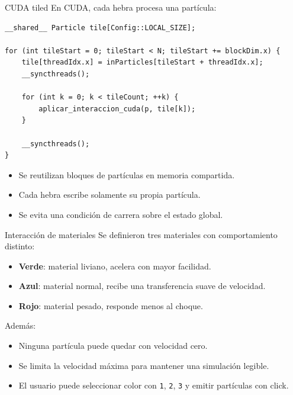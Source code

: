 \documentclass[aspectratio=169]{beamer}
\begin{document}
\begin{frame}[fragile]{CUDA tiled}
    En CUDA, cada hebra procesa una partícula:

\begin{verbatim}
__shared__ Particle tile[Config::LOCAL_SIZE];

for (int tileStart = 0; tileStart < N; tileStart += blockDim.x) {
    tile[threadIdx.x] = inParticles[tileStart + threadIdx.x];
    __syncthreads();

    for (int k = 0; k < tileCount; ++k) {
        aplicar_interaccion_cuda(p, tile[k]);
    }

    __syncthreads();
}
\end{verbatim}

    \begin{itemize}
        \item Se reutilizan bloques de partículas en memoria compartida.
        \item Cada hebra escribe solamente su propia partícula.
        \item Se evita una condición de carrera sobre el estado global.
    \end{itemize}
\end{frame}

\begin{frame}{Interacción de materiales}
    Se definieron tres materiales con comportamiento distinto:

    \begin{itemize}
        \item \textbf{Verde}: material liviano, acelera con mayor facilidad.
        \item \textbf{Azul}: material normal, recibe una transferencia suave de velocidad.
        \item \textbf{Rojo}: material pesado, responde menos al choque.
    \end{itemize}

    \vspace{0.3cm}

    Además:

    \begin{itemize}
        \item Ninguna partícula puede quedar con velocidad cero.
        \item Se limita la velocidad máxima para mantener una simulación legible.
        \item El usuario puede seleccionar color con \texttt{1}, \texttt{2}, \texttt{3} y emitir partículas con click.
    \end{itemize}
\end{frame}
\end{document}
